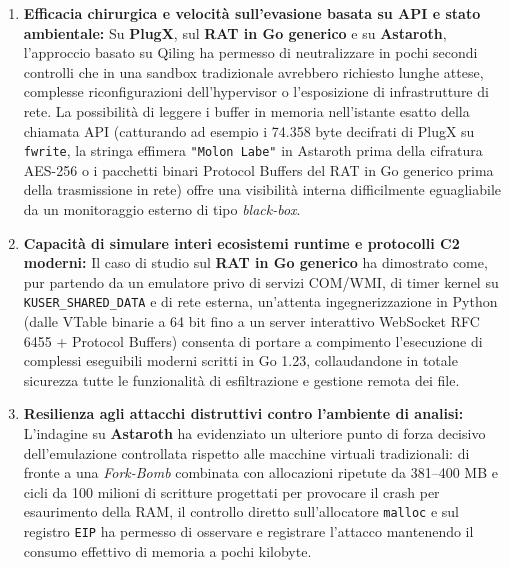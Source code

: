\documentclass[11pt, a4paper]{article}
\begin{document}
\begin{enumerate}
	\item \textbf{Efficacia chirurgica e velocit\`a sull'evasione basata su API e stato ambientale:} Su \textbf{PlugX}, sul \textbf{RAT in Go generico} e su \textbf{Astaroth}, l'approccio basato su Qiling ha permesso di neutralizzare in pochi secondi controlli che in una sandbox tradizionale avrebbero richiesto lunghe attese, complesse riconfigurazioni dell'hypervisor o l'esposizione di infrastrutture di rete. La possibilit\`a di leggere i buffer in memoria nell'istante esatto della chiamata API (catturando ad esempio i 74.358 byte decifrati di PlugX su \texttt{fwrite}, la stringa effimera \texttt{"Molon Labe"} in Astaroth prima della cifratura AES-256 o i pacchetti binari Protocol Buffers del RAT in Go generico prima della trasmissione in rete) offre una visibilit\`a interna difficilmente eguagliabile da un monitoraggio esterno di tipo \textit{black-box}.
	
	\item \textbf{Capacit\`a di simulare interi ecosistemi runtime e protocolli C2 moderni:} Il caso di studio sul \textbf{RAT in Go generico} ha dimostrato come, pur partendo da un emulatore privo di servizi COM/WMI, di timer kernel su \texttt{KUSER\_\allowbreak{}SHARED\_\allowbreak{}DATA} e di rete esterna, un'attenta ingegnerizzazione in Python (dalle VTable binarie a 64 bit fino a un server interattivo WebSocket RFC 6455 + Protocol Buffers) consenta di portare a compimento l'esecuzione di complessi eseguibili moderni scritti in Go 1.23, collaudandone in totale sicurezza tutte le funzionalit\`a di esfiltrazione e gestione remota dei file.
	
	\item \textbf{Resilienza agli attacchi distruttivi contro l'ambiente di analisi:} L'indagine su \textbf{Astaroth} ha evidenziato un ulteriore punto di forza decisivo dell'emulazione controllata rispetto alle macchine virtuali tradizionali: di fronte a una \textit{Fork-Bomb} combinata con allocazioni ripetute da 381--400 MB e cicli da 100 milioni di scritture progettati per provocare il crash per esaurimento della RAM, il controllo diretto sull'allocatore \texttt{malloc} e sul registro \texttt{EIP} ha permesso di osservare e registrare l'attacco mantenendo il consumo effettivo di memoria a pochi kilobyte.
	

\end{enumerate}
\end{document}
